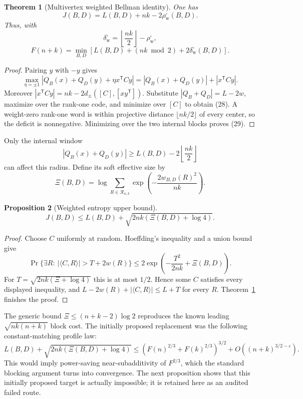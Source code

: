 \documentclass[11pt]{article}
\newtheorem{theorem}{Theorem}
\newtheorem{proposition}[theorem]{Proposition}
\begin{document}
\begin{theorem}[Multivertex weighted Bellman identity]
\label{thm:multivertex-bellman}
One has
\[
 J(B,D)=L(B,D)+nk-2\rho_{\mathrm w}^{\square}(B,D).
 \tag{28}
\]
Thus, with
\[
 \delta_{\mathrm w}^{\square}
 =\left\lfloor\frac{nk}{2}\right\rfloor
 -\rho_{\mathrm w}^{\square},
\]
\[
 F(n+k)=\min_{B,D}
 [L(B,D)+(nk\bmod2)+2\delta_{\mathrm w}^{\square}(B,D)].
 \tag{29}
\]
\end{theorem}

\begin{proof}
Pairing $y$ with $-y$ gives
\[
 \max_{\eta=\pm1}|Q_B(x)+Q_D(y)+\eta x^{\mathsf T}Cy|
 =|Q_B(x)+Q_D(y)|+|x^{\mathsf T}Cy|.
\]
Moreover
$|x^{\mathsf T}Cy|=nk-2d_\pm([C],[xy^{\mathsf T}])$.
Substitute $|Q_B+Q_D|=L-2w$, maximize over the rank-one code, and minimize
over $[C]$ to obtain (28).  A weight-zero rank-one word is within projective
distance $\lfloor nk/2\rfloor$ of every center, so the deficit is
nonnegative.  Minimizing over the two internal blocks proves (29).
\end{proof}

Only the internal window
\[
 |Q_B(x)+Q_D(y)|\ge L(B,D)-2\left\lfloor\frac{nk}{2}\right\rfloor
\]
can affect this radius.  Define its soft effective size by
\[
 \Xi(B,D)=\log\sum_{R\in\mathcal R_{n,k}}
 \exp\left(-\frac{2w_{B,D}(R)^2}{nk}\right).
\]

\begin{proposition}[Weighted entropy upper bound]
\label{prop:weighted-entropy}
\[
 J(B,D)\le L(B,D)
 +\sqrt{2nk(\Xi(B,D)+\log4)}.
 \tag{30}
\]
\end{proposition}

\begin{proof}
Choose $C$ uniformly at random.  Hoeffding's inequality and a union bound give
\[
 \Pr\{\exists R:\ |\langle C,R\rangle|>T+2w(R)\}
 \le2\exp\left(-\frac{T^2}{2nk}+\Xi(B,D)\right).
\]
For $T=\sqrt{2nk(\Xi+\log4)}$ this is at most $1/2$.  Hence some $C$
satisfies every displayed inequality, and
$L-2w(R)+|\langle C,R\rangle|\le L+T$ for every $R$.
Theorem~\ref{thm:multivertex-bellman} finishes the proof.
\end{proof}

The generic bound $\Xi\le(n+k-2)\log2$ reproduces the known leading
$\sqrt{nk(n+k)}$ block cost.  The initially proposed replacement was the
following constant-matching profile law:
\[
 L(B,D)+\sqrt{2nk(\Xi(B,D)+\log4)}
 \le(F(n)^{2/3}+F(k)^{2/3})^{3/2}
 +O((n+k)^{3/2-\varepsilon}).
 \tag{31}
\]
This would imply power-saving near-subadditivity of $F^{2/3}$, which the
standard blocking argument turns into convergence.  The next proposition
shows that this initially proposed target is actually impossible; it is
retained here as an audited failed route.
\end{document}
